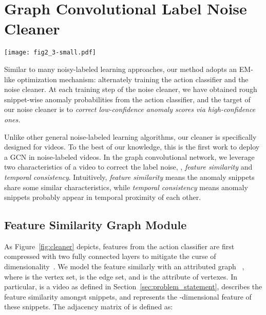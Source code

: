 \documentclass[10pt,twocolumn,letterpaper]{article}
\begin{document}
\section{Graph Convolutional Label Noise Cleaner}
\begin{figure*}[!t]
\centering\texttt{[image: fig2\_3-small.pdf]}
\caption{\textit{Overview of the training process of label noise cleaner.} The action classifier extracts spatio-temporal features from anomalous video snippets and outputs noisy snippet-level labels. Snippet-level features from the classifier are compressed and fed into two graph modules to model the feature similarity and temporal consistency of snippets. In the two graph-based modules, A darker node represents higher anomaly confidence of the snippet. The output of these two models are fused and utilized to predict the snippet-level labels with less noise. The loss is updated to correct the predictive noise via high-confidence snippets.}
\label{fig:cleaner}
\end{figure*}


Similar to many noisy-labeled learning approaches, our method adopts an EM-like optimization mechanism: alternately training the action classifier and the noise cleaner. At each training step of the noise cleaner, we have obtained rough snippet-wise anomaly probabilities from the action classifier, and the target of our noise cleaner is to \emph{correct low-confidence anomaly scores via high-confidence ones.} 

Unlike other general noise-labeled learning algorithms, our cleaner is specifically designed for videos. To the best of our knowledge, this is the first work to deploy a GCN in noise-labeled videos. In the graph convolutional network, we leverage two characteristics of a video to correct the label noise, \ie, \textit{feature similarity} and \textit{temporal consistency}. Intuitively, \textit{feature similarity} means the anomaly snippets share some similar characteristics, while \textit{temporal consistency} means anomaly snippets probably appear in temporal proximity of each other.

\subsection{Feature Similarity Graph Module}
As Figure~\ref{fig:cleaner} depicts, features from the action classifier are first compressed with two fully connected layers to mitigate the curse of dimensionality~\cite{Bellman:1957}. We model the feature similarly with an attributed graph~\cite{Pfeiffer:2014:AGM:2566486.2567993}  , where  is the vertex set,  is the edge set, and  is the attribute of vertexes. In particular,  is a video as defined in Section~\ref{sec:problem_statement},  describes the feature similarity amongst snippets, and  represents the -dimensional feature of these  snippets. The adjacency matrix  of  is defined as:
\end{document}
